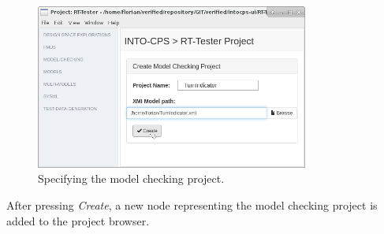 %
%
%
\begin{figure}[ht]
    \centerline{\includegraphics[width=0.8\textwidth]{figures/VSI-MC_Create-MC-Project-Dialog}}
    \caption{Specifying the model checking project.}
    \label{figure:INTO-CPS-App:Create-MC-Project-Dialog}
\end{figure}
\clearpage
%
%
%
After pressing \emph{Create}, a new node representing the model checking project is added to
the project browser.

